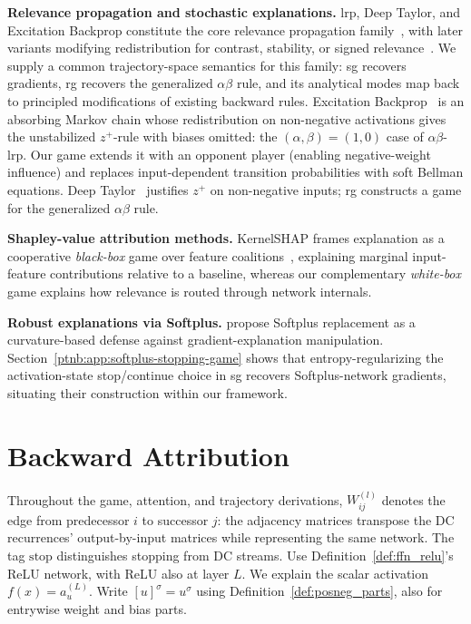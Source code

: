 \textbf{Relevance propagation and stochastic explanations.} \ac{lrp}, Deep Taylor, and Excitation
Backprop constitute the core relevance propagation family~\parencite{Bach2015,Montavon2017DeepTaylor,Zhang2018pointinggame}, with later variants modifying redistribution for contrast, stability, or
signed relevance~\parencite{Binder2016LRN,Kohlbrenner2020,Gu2019CLRP,Nam2020,vukadin2024abslrp}. We supply
a common trajectory-space semantics for this family: \ac{sg} recovers gradients, \ac{rg} recovers
the generalized $\alpha\beta$ rule, and its analytical modes map back to principled modifications
of existing backward rules.
Excitation Backprop~\parencite{Zhang2018pointinggame} is an absorbing Markov chain whose redistribution
on non-negative activations gives the unstabilized $z^+$-rule with biases omitted: the
$(\alpha,\beta)=(1,0)$ case of $\alpha\beta$-\ac{lrp}. Our game extends it with an opponent player (enabling negative-weight influence) and replaces
input-dependent transition probabilities with soft Bellman equations.
Deep Taylor~\parencite{Montavon2017DeepTaylor} justifies $z^+$ on non-negative inputs;
\ac{rg} constructs a game for the generalized $\alpha\beta$ rule.

\textbf{Shapley-value attribution methods.} KernelSHAP frames explanation as a cooperative \emph{black-box} game over feature coalitions~\parencite{LundbergLee2017}, explaining marginal input-feature contributions relative to a
baseline, whereas our complementary \emph{white-box} game explains how relevance is routed through network internals.

\textbf{Robust explanations via Softplus.} \textcite{Dombrowski2020} propose Softplus replacement as a
curvature-based defense against gradient-explanation manipulation.
Section~\ref{ptnb:app:softplus-stopping-game} shows that entropy-regularizing the activation-state
stop/continue choice in \ac{sg} recovers Softplus-network gradients, situating their construction
within our framework.

\section{Backward Attribution}\label{ptnb:sec:background}

Throughout the game, attention, and trajectory derivations, $W^{(l)}_{ij}$ denotes the edge from
predecessor $i$ to successor $j$: the adjacency matrices transpose the DC recurrences' output-by-input
matrices while representing the same network. The tag $\mathrm{stop}$ distinguishes stopping from
DC streams. Use Definition~\ref{def:ffn_relu}'s ReLU network, with ReLU also at layer $L$.
We explain the scalar activation $f(x)=a_u^{(L)}$.
Write $[u]^\sigma=u^\sigma$ using Definition~\ref{def:posneg_parts}, also for entrywise weight and bias parts.

